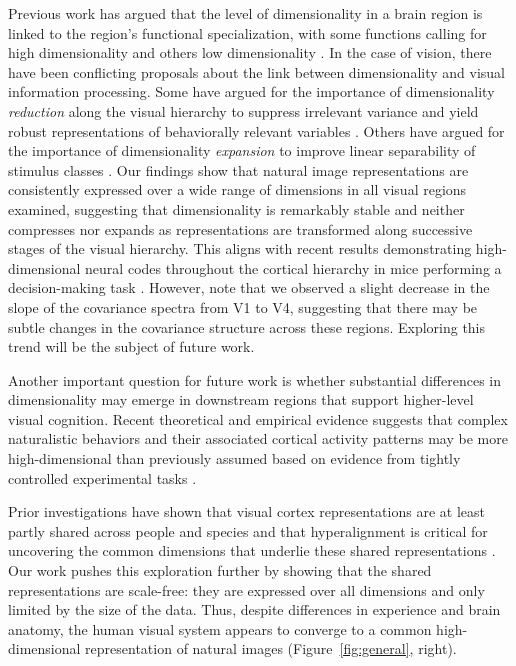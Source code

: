 \documentclass[10pt]{article}
\begin{document}
Previous work has argued that the level of dimensionality in a brain region is linked to the region's functional specialization, with some functions calling for high dimensionality and others low dimensionality \autocites[e.g.][]{Fusi2016,CaycoGajic2019}. In the case of vision, there have been conflicting proposals about the link between dimensionality and visual information processing. Some have argued for the importance of dimensionality \emph{reduction} along the visual hierarchy to suppress irrelevant variance and yield robust representations of behaviorally relevant variables \autocite{Ansuini2019,Cohen2020,Lehky2016,Fusi2016}. Others have argued for the importance of dimensionality \emph{expansion} to improve linear separability of stimulus classes \autocite{Babadi2014,Elmoznino2024}. Our findings show that natural image representations are consistently expressed over a wide range of dimensions in all visual regions examined, suggesting that dimensionality is remarkably stable and neither compresses nor expands as representations are transformed along successive stages of the visual hierarchy. This aligns with recent results demonstrating high-dimensional neural codes throughout the cortical hierarchy in mice performing a decision-making task \autocite{Posani2024}. However, note that we observed a slight decrease in the slope of the covariance spectra from V1 to V4, suggesting that there may be subtle changes in the covariance structure across these regions. Exploring this trend will be the subject of future work.

Another important question for future work is whether substantial differences in dimensionality may emerge in downstream regions that support higher-level visual cognition. Recent theoretical and empirical evidence suggests that complex naturalistic behaviors and their associated cortical activity patterns may be more high-dimensional than previously assumed based on evidence from tightly controlled experimental tasks \autocite{Rigotti2013,Yan2020,Bialek2022,Posani2024}.

Prior investigations have shown that visual cortex representations are at least partly shared across people and species \autocite{Haxby2011,Kriegeskorte2008} and that hyperalignment is critical for uncovering the common dimensions that underlie these shared representations \autocite{Haxby2011,Haxby2020}. Our work pushes this exploration further by showing that the shared representations are scale-free: they are expressed over all dimensions and only limited by the size of the data. Thus, despite differences in experience and brain anatomy, the human visual system appears to converge to a common high-dimensional representation of natural images (Figure~\ref{fig:general}, right).
\end{document}
